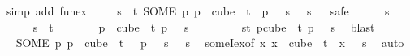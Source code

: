 \begin{isabellebody}
\ {\isacharparenleft}{\kern0pt}simp\ add{\isacharcolon}{\kern0pt}\ fun{\isacharunderscore}{\kern0pt}ex{\isacharparenright}{\kern0pt}\isanewline
\ \ \isamarkupfalse%
\ {}{\isacharcolon}{\kern0pt}\ {\isachardoublequoteopen}{\isasymforall}s\ {\isasymin}\ {\isacharbraceleft}{\kern0pt}{\isachardot}{\kern0pt}{\isachardot}{\kern0pt}{\isacharless}{\kern0pt}t{\isacharbraceright}{\kern0pt}{\isachardot}{\kern0pt}\ {\isacharparenleft}{\kern0pt}SOME\ p{\isachardot}{\kern0pt}\ p\ {\isasymin}\ cube\ {}\ t\ {\isasymand}\ p\ {}\ {\isacharequal}{\kern0pt}\ s{\isacharparenright}{\kern0pt}\ {}\ {\isacharequal}{\kern0pt}\ s{\isachardoublequoteclose}\isanewline
\ \ \isamarkupfalse%
{\isacharparenleft}{\kern0pt}safe{\isacharparenright}{\kern0pt}\isanewline
\ \ \ \ \isamarkupfalse%
\ s\isanewline
\ \ \ \ \isamarkupfalse%
\ {\isachardoublequoteopen}s\ {\isacharless}{\kern0pt}\ t{\isachardoublequoteclose}\isanewline
\ \ \ \ \isamarkupfalse%
\ \isamarkupfalse%
\ {\isachardoublequoteopen}{\isasymexists}p\ {\isasymin}\ cube\ {}\ t{\isachardot}{\kern0pt}\ p\ {}\ {\isacharequal}{\kern0pt}\ s{\isachardoublequoteclose}\ \isanewline
\ \ \ \ \ \ \isamarkupfalse%
\ {\isacartoucheopen}{\isasymforall}s{\isasymin}{\isacharbraceleft}{\kern0pt}{\isachardot}{\kern0pt}{\isachardot}{\kern0pt}{\isacharless}{\kern0pt}t{\isacharbraceright}{\kern0pt}{\isachardot}{\kern0pt}\ {\isasymexists}p{\isasymin}cube\ {}\ t{\isachardot}{\kern0pt}\ p\ {}\ {\isacharequal}{\kern0pt}\ s{\isacartoucheclose}\ \isamarkupfalse%
\ blast\isanewline
\ \ \ \ \isamarkupfalse%
\ \isamarkupfalse%
\ {\isachardoublequoteopen}{\isacharparenleft}{\kern0pt}SOME\ p{\isachardot}{\kern0pt}\ p\ {\isasymin}\ cube\ {}\ t\ {\isasymand}\ \ p\ {}\ {\isacharequal}{\kern0pt}\ s{\isacharparenright}{\kern0pt}\ {}\ {\isacharequal}{\kern0pt}\ s{\isachardoublequoteclose}\ \isamarkupfalse%
\ someI{\isacharunderscore}{\kern0pt}ex{\isacharbrackleft}{\kern0pt}of\ {\isachardoublequoteopen}{\isasymlambda}x{\isachardot}{\kern0pt}\ x\ {\isasymin}\ cube\ {}\ t\ {\isasymand}\ x\ {}\ {\isacharequal}{\kern0pt}\ s{\isachardoublequoteclose}{\isacharbrackright}{\kern0pt}\ \isamarkupfalse%
\ auto\isanewline
\ \ \isamarkupfalse%
\isanewline
\isanewline
\ \ \isamarkupfalse%

\end{isabellebody}
